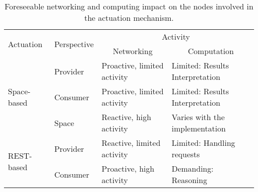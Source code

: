 
\begin{table}[htbp]
  \caption{Foreseeable networking and computing impact on the nodes involved in the actuation mechanism.}
  \begin{center}
    \footnotesize
    \begin{tabular}{llp{4cm}p{4.4cm}}
      \hline
      \multirow{2}{*}{Actuation} &
      \multirow{2}{*}{Perspective} &
      \multicolumn{2}{c}{Activity} \\
      &
      ~ &
      \multicolumn{1}{c}{Networking} &
      \multicolumn{1}{c}{Computation} \\
      \hline
      \multirow{3}{*}{Space-based} & Provider & Proactive, limited activity & Limited: Results Interpretation \\
				    ~ & Consumer & Proactive, limited activity & Limited: Results Interpretation \\
				    ~ & Space & Reactive, high activity & Varies with the implementation \\[0.2cm]
      \multirow{2}{*}{REST-based} & Provider & Reactive, limited activity & Limited: Handling requests \\
       ~       & Consumer & Proactive, high activity &  Demanding: Reasoning \\ %
      \hline
    \end{tabular}
  \end{center}
  \label{tab:actuation_networking_computing}
\end{table}